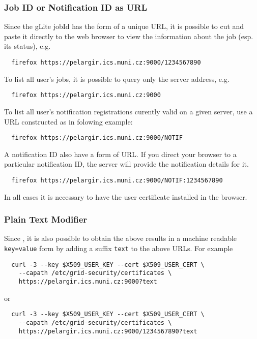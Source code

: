 \subsubsection{Job ID or Notification ID as URL}
\label{simple}
Since the gLite jobId has the form of a unique URL, it is possible to cut and paste it directly
to the web browser to view the information about the job (esp. its status), e.g.
\begin{verbatim}
  firefox https://pelargir.ics.muni.cz:9000/1234567890
\end{verbatim}
To list all user's jobs, it is possible to query only the \LB server address, e.g.
\begin{verbatim}
  firefox https://pelargir.ics.muni.cz:9000
\end{verbatim}
To list all user's notification registrations curently valid on a given \LB server, use a URL constructed as in folowing example:
\begin{verbatim}
  firefox https://pelargir.ics.muni.cz:9000/NOTIF
\end{verbatim}
A notification ID also have a form of URL. If you direct your browser to a particular notification ID, the \LB server will provide the notification details for it.
\begin{verbatim}
  firefox https://pelargir.ics.muni.cz:9000/NOTIF:1234567890
\end{verbatim}
In all cases it is necessary to have the user certificate installed in the browser.

\subsubsection{Plain Text Modifier}

Since , it is also possible to obtain the above results in a machine readable 
\verb'key=value' form by adding a suffix \verb'text' to the above URLs. For example
\begin{verbatim}
  curl -3 --key $X509_USER_KEY --cert $X509_USER_CERT \
    --capath /etc/grid-security/certificates \ 
    https://pelargir.ics.muni.cz:9000?text
\end{verbatim}
or
\begin{verbatim}
  curl -3 --key $X509_USER_KEY --cert $X509_USER_CERT \
    --capath /etc/grid-security/certificates \ 
    https://pelargir.ics.muni.cz:9000/1234567890?text
\end{verbatim}



